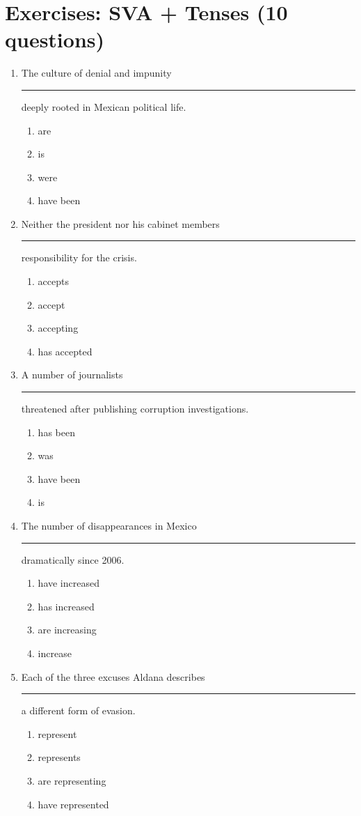 \documentclass[10pt,a4paper]{article}
\begin{document}
\section*{Exercises: SVA + Tenses (10 questions)}

\begin{enumerate}[label=\textbf{\arabic*.}, leftmargin=*]

\item The culture of denial and impunity \rule{2cm}{0.4pt}
deeply rooted in Mexican political life.
\begin{enumerate}[label=(\Alph*)]
\item are \item is \item were \item have been
\end{enumerate}

\item Neither the president nor his cabinet members
\rule{2cm}{0.4pt} responsibility for the crisis.
\begin{enumerate}[label=(\Alph*)]
\item accepts \item accept \item accepting \item has accepted
\end{enumerate}

\item A number of journalists \rule{2cm}{0.4pt} threatened
after publishing corruption investigations.
\begin{enumerate}[label=(\Alph*)]
\item has been \item was \item have been \item is
\end{enumerate}

\item The number of disappearances in Mexico \rule{2cm}{0.4pt}
dramatically since 2006.
\begin{enumerate}[label=(\Alph*)]
\item have increased \item has increased
\item are increasing \item increase
\end{enumerate}

\item Each of the three excuses Aldana describes
\rule{2cm}{0.4pt} a different form of evasion.
\begin{enumerate}[label=(\Alph*)]
\item represent \item represents
\item are representing \item have represented
\end{enumerate}


\end{enumerate}
\end{document}
